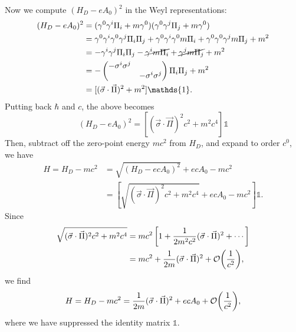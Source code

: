 \documentclass[11pt]{article}
\theoremstyle{definition}
\begin{document}
Now we compute $(H_D-eA_0)^2$ in the Weyl representations:
\begin{equation}
    \begin{aligned}
        (H_D-eA_0)^2 &= (\gamma^0\gamma^i\Pi_i + m\gamma^0)(\gamma^0\gamma^j\Pi_j + m\gamma^0) \\
        &= \gamma^0\gamma^i\gamma^0\gamma^j\Pi_i\Pi_j + \gamma^0\gamma^i\gamma^0m\Pi_i + \gamma^0\gamma^0\gamma^jm\Pi_j + m^2\\
        &= -\gamma^i\gamma^j\Pi_i\Pi_j - \cancel{\gamma^im\Pi_i} + \cancel{\gamma^jm\Pi_j} + m^2\\
        &= -
        \begin{pmatrix}
            -\sigma^i\sigma^j&\\
            &-\sigma^i\sigma^j
        \end{pmatrix}
        \Pi_i\Pi_j + m^2\\
        &= [(\vec{\sigma}\cdot\vec{\Pi})^2 + m^2]\mathds{1}.
    \end{aligned}
\end{equation}
Putting back $\hbar$ and $c$, the above becomes
\begin{equation}
    (H_D-eA_0)^2 = [(\vec{\sigma}\cdot\vec{\Pi})^2c^2 + m^2c^4]\mathds{1}
\end{equation}
Then, subtract off the zero-point energy $mc^2$ from $H_D$, and expand to order $c^0$, we have
\begin{equation}
    \begin{aligned}
        H = H_D - mc^2 &= \sqrt{(H_D-ecA_0)^2} + ecA_0 -mc^2 \\
        &= \left[\sqrt{(\vec{\sigma}\cdot\vec{\Pi})^2c^2 + m^2c^4} + ecA_0 -mc^2 \right]\mathds{1}.
    \end{aligned}
\end{equation}
Since
\begin{equation}
\begin{aligned}
    \sqrt{(\vec{\sigma}\cdot\vec{\Pi})^2c^2 + m^2c^4} &= mc^2\left[1 + \frac{1}{2m^2c^2}(\vec{\sigma}\cdot\vec{\Pi})^2 + \cdots \right]\\
    &= mc^2 + \frac{1}{2m}(\vec{\sigma}\cdot\vec{\Pi})^2 + \order{\frac{1}{c^2}},
\end{aligned}
\end{equation}
we find
\begin{equation}
    H = H_D - mc^2 = \frac{1}{2m}(\vec{\sigma}\cdot\vec{\Pi})^2 + ecA_0 + \order{\frac{1}{c^2}},
\end{equation}
where we have suppressed the identity matrix $\mathds{1}$.
\end{document}
